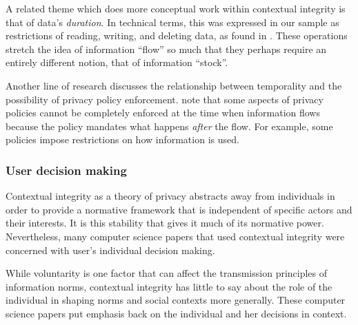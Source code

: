 \documentclass[../thesis.tex]{subfiles}
\begin{document}
A related theme which does more conceptual work within contextual
integrity is that of data's \textit{duration}. In
technical terms, this was expressed in our sample as restrictions of
reading, writing, and deleting data, as found in \citet{kayes2013aegis}.
These operations stretch the idea of information
``flow'' so much that they perhaps
require an entirely different notion, that of information
``stock''.

Another line of research discusses the relationship between temporality
and the possibility of privacy policy enforcement.
\citet{datta2011understanding}
note that some aspects of privacy policies cannot be completely
enforced at the time when information flows because the policy mandates
what happens \textit{after} the flow. For example, some policies impose
restrictions on how information is used.

\subsubsection{User decision making}
\label{CI4.4.4}

Contextual integrity as a theory of privacy abstracts away from
individuals in order to provide a normative framework that is
independent of specific actors and their interests. It is this
stability that gives it much of its normative power. Nevertheless, many
computer science papers that used contextual integrity were concerned
with user's individual decision making.


While voluntarity is one factor that can affect the transmission
principles of information norms, contextual integrity has little to say
about the role of the individual in shaping norms and social contexts
more generally. These computer science papers put emphasis back on the
individual and her decisions in context.
\end{document}
